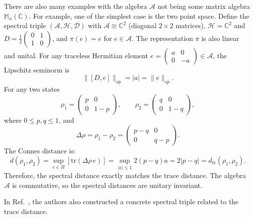 \documentclass[a4paper,12pt]{article}
\begin{document}
There are also many examples with the algebra $\mathcal{A}$ not being some matrix algebra $\mathbb{M}_n (\mathbb{C})$.
For example, one of the simplest case is the two point space.
Define the spectral triple $(\mathcal{A}, \mathcal{H}, \mathcal{D})$ with $\mathcal{A}\cong\mathbb{C}^2$ (diagonal $2 \times 2$ matrices),
$\mathcal{H}=\mathbb{C}^2$ and $D = \frac{1}{2} \left(\begin{array}{cc}
	0 & 1\\
	1 & 0
\end{array}\right)$, and $\pi(e)=e$ for $e\in\mathcal{A}$. The representation $\pi$ is also linear and unital. For any traceless Hermitian
element $e = \left(\begin{array}{cc}
	a & 0\\
	0 & - a
\end{array}\right) \in \mathcal{A}$, the Lipschitz seminorm is
\begin{equation}
\| [D, e] \|_{o p} = \left| \text{$a$} \right| = \|e\|_{op} .
\end{equation}
For any two states
\begin{equation}
\rho_1 = \left(\begin{array}{cc}
	p & 0\\
	0 & 1 - p
\end{array}\right),\qquad
\rho_2 = \left(\begin{array}{cc}
	q & 0\\
	0 & 1 - q
\end{array}\right),
\end{equation}
where $0\leqslant p,q\leqslant1$, and
\begin{equation}
\Delta\rho =\rho_1-\rho_2= \left(\begin{array}{cc}
p-q & 0\\
0 & q - p
\end{array}\right).
\end{equation}
The Connes distance is:
\begin{equation}
d (\rho_1,\rho_2) = \sup_{e \in B}[ \mathrm{tr} (\Delta \rho
\, e)] = \sup_{|a| \le 1} 2 (p - q) a = 2 |p - q| =
d_{\mathrm{tr}} (\rho_1,\rho_2) .
\end{equation}
Therefore, the spectral distance exactly matches the trace distance. The algebra $\mathcal{A}$ is commutative, so the spectral distances are unitary invariant.

In Ref.~\cite{Kumar1}, the authors also constructed a concrete spectral triple related to the trace distance.
\end{document}
